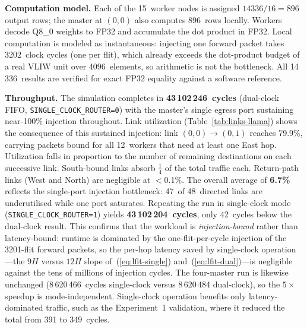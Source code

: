 \textbf{Computation model.}  Each of the 15~worker nodes is assigned
$14336/16 = 896$ output rows; the master at $(0,0)$ also computes 896~rows
locally.  Workers decode Q8\_0 weights to FP32 and accumulate the dot product
in FP32.  Local computation is modeled as instantaneous: injecting one forward
packet takes 3202~clock cycles (one per flit), which already exceeds the
dot-product budget of a real VLIW unit over 4096~elements, so arithmetic
is not the bottleneck.  All
14\,336~results are verified for exact FP32 equality against a software
reference.

\textbf{Throughput.}  The simulation completes in \textbf{43\,102\,246~cycles}
(dual-clock FIFO, \texttt{SINGLE\_CLOCK\_ROUTER=0})
with the master's single egress port sustaining near-100\% injection throughout.
Link utilization (Table~\ref{tab:links-llama}) shows the consequence of this
sustained injection: link $(0,0)\!\to\!(0,1)$ reaches 79.9\%,
carrying packets bound for all 12~workers that need at least one East hop.
Utilization falls in proportion to the number of remaining destinations on
each successive link.  South-bound links absorb $\tfrac{1}{4}$ of the total
traffic each.  Return-path links (West and North) are negligible at $<$0.1\%.
The overall average of \textbf{6.7\%} reflects the single-port injection
bottleneck: 47~of 48~directed links are underutilised while one port
saturates.  Repeating the run in single-clock mode
(\texttt{SINGLE\_CLOCK\_ROUTER=1}) yields \textbf{43\,102\,204~cycles}, only
42~cycles below the dual-clock result.  This confirms that the workload is
\emph{injection-bound} rather than latency-bound: runtime is dominated by the
one-flit-per-cycle injection of the 3201-flit forward packets, so the per-hop
latency saved by single-clock operation---the $9H$ versus $12H$ slope
of~(\ref{eq:lfit-single}) and~(\ref{eq:lfit-dual})---is negligible against the
tens of millions of injection cycles.  The four-master run is likewise
unchanged (8\,620\,466~cycles single-clock versus 8\,620\,484 dual-clock), so
the $5\times$ speedup is mode-independent.  Single-clock operation benefits
only latency-dominated traffic, such as the Experiment~1 validation, where it
reduced the total from 391 to 349~cycles.

